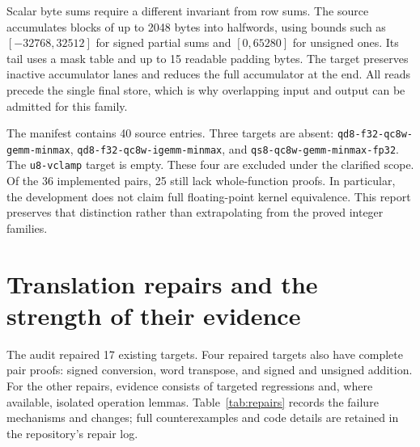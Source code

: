 \documentclass[11pt]{article}
\newcommand{\code}[1]{{\small\texttt{#1}}}
\begin{document}
Scalar byte sums require a different invariant from row sums. The source accumulates blocks of up to 2048 bytes into halfwords, using bounds such as $[-32768,32512]$ for signed partial sums and $[0,65280]$ for unsigned ones. Its tail uses a mask table and up to 15 readable padding bytes. The target preserves inactive accumulator lanes and reduces the full accumulator at the end. All reads precede the single final store, which is why overlapping input and output can be admitted for this family.

The manifest contains 40 source entries. Three targets are absent: \code{qd8-f32-qc8w-gemm-minmax}, \code{qd8-f32-qc8w-igemm-minmax}, and \code{qs8-qc8w-gemm-minmax-fp32}. The \code{u8-vclamp} target is empty. These four are excluded under the clarified scope. Of the 36 implemented pairs, 25 still lack whole-function proofs. In particular, the development does not claim full floating-point kernel equivalence. This report preserves that distinction rather than extrapolating from the proved integer families.

\section{Translation repairs and the strength of their evidence}
The audit repaired 17 existing targets. Four repaired targets also have complete pair proofs: signed conversion, word transpose, and signed and unsigned addition. For the other repairs, evidence consists of targeted regressions and, where available, isolated operation lemmas. Table~\ref{tab:repairs} records the failure mechanisms and changes; full counterexamples and code details are retained in the repository's repair log.
\end{document}
